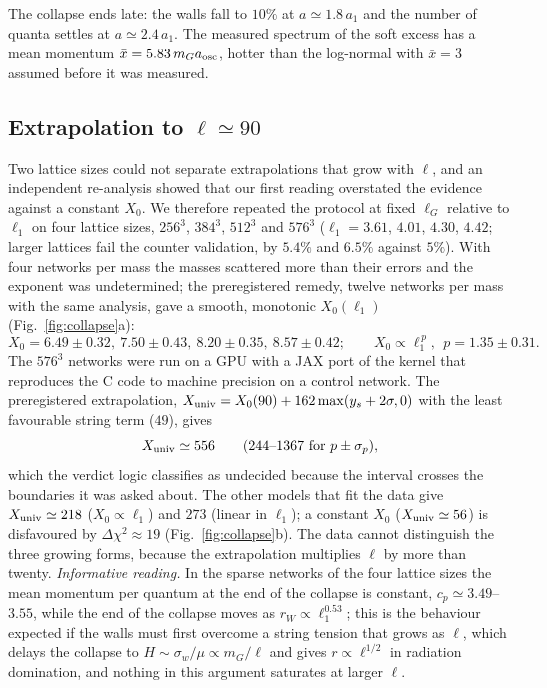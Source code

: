 \documentclass[11pt,a4paper]{article}
\newcommand{\Xu}{X_{\rm univ}}
\begin{document}
The collapse ends late: the walls fall to $10\%$ at $a\simeq1.8\,a_1$ and the number of quanta settles at $a\simeq2.4\,a_1$.
The measured spectrum of the soft excess has a mean momentum $\bar x=5.83\,m_Ga_{\rm osc}$, hotter than the log-normal with $\bar x=3$ assumed before it was measured.

\subsection{Extrapolation to \texorpdfstring{$\ell\simeq90$}{ell ≈ 90}}

Two lattice sizes could not separate extrapolations that grow with $\ell$, and an independent re-analysis showed that our first reading overstated the evidence against a constant $X_0$.
We therefore repeated the protocol at fixed $\ell_G$ relative to $\ell_1$ on four lattice sizes, $256^3$, $384^3$, $512^3$ and $576^3$ ($\ell_1=3.61$, $4.01$, $4.30$, $4.42$; larger lattices fail the counter validation, by $5.4\%$ and $6.5\%$ against $5\%$).
With four networks per mass the masses scattered more than their errors and the exponent was undetermined; the preregistered remedy, twelve networks per mass with the same analysis, gave a smooth, monotonic $X_0(\ell_1)$ (Fig.~\ref{fig:collapse}a):
\begin{equation}
X_0 = 6.49\pm0.32,\ 7.50\pm0.43,\ 8.20\pm0.35,\ 8.57\pm0.42;\qquad X_0\propto\ell_1^{\,p},\ \ p=1.35\pm0.31 .
\end{equation}
The $576^3$ networks were run on a GPU with a JAX port of the kernel that reproduces the C code to machine precision on a control network.
The preregistered extrapolation, $\Xu=X_0(90)+162\max(y_s+2\sigma,0)$ with the least favourable string term ($49$), gives
\begin{equation}
\Xu \simeq 556\qquad (244\text{--}1367\ \text{for}\ p\pm\sigma_p),
\end{equation}
which the verdict logic classifies as undecided because the interval crosses the boundaries it was asked about.
The other models that fit the data give $\Xu\simeq218$ ($X_0\propto\ell_1$) and $273$ (linear in $\ell_1$); a constant $X_0$ ($\Xu\simeq56$) is disfavoured by $\Delta\chi^2\approx19$ (Fig.~\ref{fig:collapse}b).
The data cannot distinguish the three growing forms, because the extrapolation multiplies $\ell$ by more than twenty.
\emph{Informative reading.} In the sparse networks of the four lattice sizes the mean momentum per quantum at the end of the collapse is constant, $c_p\simeq3.49$--$3.55$, while the end of the collapse moves as $r_W\propto\ell_1^{0.53}$; this is the behaviour expected if the walls must first overcome a string tension that grows as $\ell$, which delays the collapse to $H\sim\sigma_w/\mu\propto m_G/\ell$ and gives $r\propto\ell^{1/2}$ in radiation domination, and nothing in this argument saturates at larger $\ell$.
\end{document}
